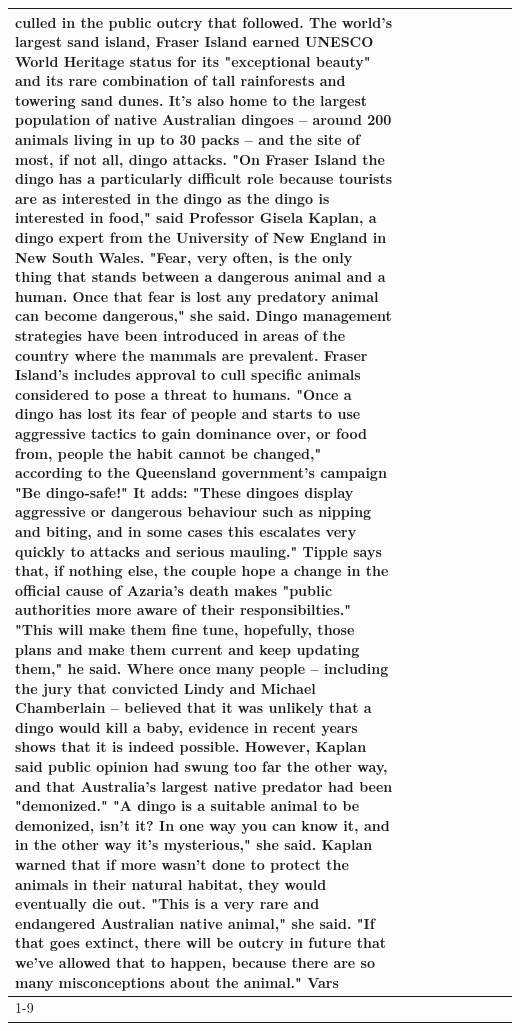 \begin{table}[H]
\begin{tabular}{lllrlllll}
culled in the public outcry that followed. The world's largest sand island, Fraser Island earned UNESCO World Heritage status for its "exceptional beauty" and its rare combination of tall rainforests and towering sand dunes. It's also home to the largest population of native Australian dingoes -- around 200 animals living in up to 30 packs -- and the site of most, if not all, dingo attacks. "On Fraser Island the dingo has a particularly difficult role because tourists are as interested in the dingo as the dingo is interested in food," said Professor Gisela Kaplan, a dingo expert from the University of New England in New South Wales. "Fear, very often, is the only thing that stands between a dangerous animal and a human. Once that fear is lost any predatory animal can become dangerous," she said. Dingo management strategies have been introduced in areas of the country where the mammals are prevalent. Fraser Island's includes approval to cull specific animals considered to pose a threat to humans. "Once a dingo has lost its fear of people and starts to use aggressive tactics to gain dominance over, or food from, people the habit cannot be changed," according to the Queensland government's campaign "Be dingo-safe!" It adds: "These dingoes display aggressive or dangerous behaviour such as nipping and biting, and in some cases this escalates very quickly to attacks and serious mauling." Tipple says that, if nothing else, the couple hope a change in the official cause of Azaria's death makes "public authorities more aware of their responsibilties." "This will make them fine tune, hopefully, those plans and make them current and keep updating them," he said. Where once many people -- including the jury that convicted Lindy and Michael Chamberlain -- believed that it was unlikely that a dingo would kill a baby, evidence in recent years shows that it is indeed possible. However, Kaplan said public opinion had swung too far the other way, and that Australia's largest native predator had been "demonized." "A dingo is a suitable animal to be demonized, isn't it? In one way you can know it, and in the other way it's mysterious," she said. Kaplan warned that if more wasn't done to protect the animals in their natural habitat, they would eventually die out. "This is a very rare and endangered Australian native animal," she said. "If that goes extinct, there will be outcry in future that we've allowed that to happen, because there are so many misconceptions about the animal." Vars \\
\cline{1-9}

\end{tabular}
\end{table}
